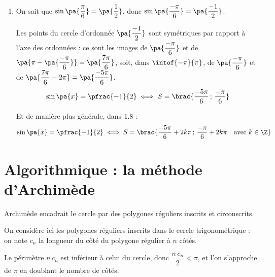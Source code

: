 \begin{methode}
\begin{correction}
\begin{enumerate}
			      Les points du cercle d'abscisse $\pa{\dfrac{1}{2}}$ sont symétriques par rapport à l'axe des abscisses : ce sont les images de $\pa{\dfrac{\pi}{3}}$ et de $\pa{\dfrac{-\pi}{3}}$, c'est-à-dire de $\pa{2\pi - \dfrac{\pi}{3}} = \pa{\dfrac{5\pi}{3}}$ dans $\intff{0}{2\pi}$.
			      \[
				      \cos\pa{x} = \pfrac{1}{2} \iff S=\brac{\dfrac{\pi}{3}\,;\,\dfrac{5\pi}{3}}
			      \]

			      Et de manière plus générale, dans $\R$ :
			      \[
				      \cos\pa{x} = \pfrac{1}{2} \iff S=\brac{\dfrac{\pi}{3}+2k\pi\,;\,\dfrac{5\pi}{3}+2k\pi\quad \text{avec}\ k\in\Z}
			      \]

			\item On sait que $\sin\pa{\dfrac{\pi}{6}} = \pa{\dfrac{1}{2}}$, donc $\sin\pa{\dfrac{-\pi}{6}} = \pa{\dfrac{-1}{2}}$.

			      Les points du cercle d'ordonnée $\pa{\dfrac{-1}{2}}$ sont symétriques par rapport à l'axe des ordonnées : ce sont les images de $\pa{\dfrac{-\pi}{6}}$ et de $\pa{\pi - \pa{\dfrac{-\pi}{6}}} = \pa{\dfrac{7\pi}{6}}$, soit, dans $\intof{-\pi}{\pi}$, de $\pa{\dfrac{-\pi}{6}}$ et de $\pa{\dfrac{7\pi}{6} - 2\pi} = \pa{\dfrac{-5\pi}{6}}$.
			      \[
				      \sin\pa{x} = \pfrac{-1}{2} \iff S=\brac{\dfrac{-5\pi}{6}\,;\,\dfrac{-\pi}{6}}
			      \]

			      Et de manière plus générale, dans $\R$ :
			      \[
				      \sin\pa{x} = \pfrac{-1}{2} \iff S=\brac{\dfrac{-5\pi}{6}+2k\pi\,;\,\dfrac{-\pi}{6}+2k\pi\quad \text{avec}\ k\in\Z}
			      \]
		\end{enumerate}
	\end{correction}
\end{methode}

\section{Algorithmique : la méthode d'Archimède}

Archimède encadrait le cercle par des polygones réguliers inscrits et circonscrits.

On considère ici les polygones réguliers inscrits dans le cercle trigonométrique : on note $c_n$ la longueur du côté du polygone régulier à $n$ côtés.

Le périmètre $n\,c_n$ est inférieur à celui du cercle, donc $\dfrac{n\,c_n}{2} < \pi$, et l'on s'approche de $\pi$ en doublant le nombre de côtés.

